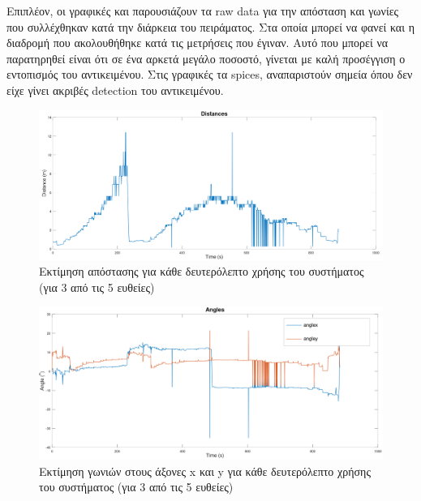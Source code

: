 Επιπλέον, οι γραφικές  και  παρουσιάζουν τα raw data για την απόσταση και γωνίες που συλλέχθηκαν κατά την διάρκεια του πειράματος. Στα οποία μπορεί να φανεί και η διαδρομή που ακολουθήθηκε κατά τις μετρήσεις που έγιναν. Αυτό που μπορεί να παρατηρηθεί είναι ότι σε ένα αρκετά μεγάλο ποσοστό, γίνεται με καλή προσέγγιση ο εντοπισμός του αντικειμένου. Στις γραφικές τα spices, αναπαριστούν σημεία όπου δεν είχε γίνει ακριβές detection του αντικειμένου.

\begin{figure}[H]
  \centering
  \includegraphics[width=\linewidth]{../Images/Experiments-Results/raspberry-exp-dist.png}
  \decoRule
  \caption[Εκτίμηση απόστασης για κάθε δευτερόλεπτο χρήσης του συστήματος]{Εκτίμηση απόστασης για κάθε δευτερόλεπτο χρήσης του συστήματος (για 3 από τις 5 ευθείες)}
  \label{fig:dist-experiment-example}
\end{figure}


\begin{figure}[H]
  \centering
  \includegraphics[width=\linewidth]{../Images/Experiments-Results/raspberry-exp-angles.png}
  \decoRule
  \caption[Εκτίμηση γωνιών στους άξονες x και y για κάθε δευτερόλεπτο χρήσης του συστήματος]{Εκτίμηση γωνιών στους άξονες x και y για κάθε δευτερόλεπτο χρήσης του συστήματος (για 3 από τις 5 ευθείες)}
  \label{fig:angles-usage-experiment-example}
\end{figure}

